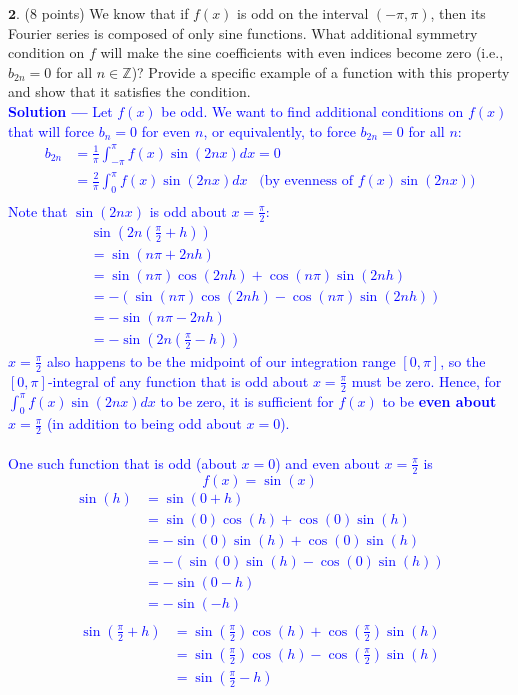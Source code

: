 \documentclass[12pt]{article}
\begin{document}
\vspace{0.3in}

\noindent $\textbf{2}$. (8 points) We know that if $f(x)$ is odd on the interval $(-\pi, \pi)$, then its Fourier series is composed of only sine functions. What additional symmetry condition on $f$ will make the sine coefficients with even indices become zero (i.e., $b_{2n} = 0 $ for all $n \in \mathbb{Z}$)? Provide a specific example of a function with this property and show that it satisfies the condition. \\

\textcolor{blue}{\textbf{Solution —} Let $f(x)$ be odd. We want to find additional conditions on $f(x)$ that will force $b_{n} = 0$ for even $n$, or equivalently, to force $b_{2n} = 0$ for all $n$:
\begin{align*}
b_{2n} &= \frac{1}{\pi} \int_{-\pi}^{\pi} f(x) \sin(2nx) dx = 0 \\
&= \frac{2}{\pi} \int_{0}^{\pi} f(x) \sin(2nx) dx \;\;\; \text{(by evenness of $f(x)\sin(2nx)$)} \\
\end{align*}
Note that $\sin(2nx)$ is odd about $x=\frac{\pi}{2}$: 
\begin{align*}
& \sin\left( 2n \left( \frac{\pi}{2} + h \right) \right) \\
&= \sin\left( n\pi + 2nh \right) \\
&= \sin(n\pi) \cos(2nh) + \cos(n\pi)\sin(2nh)\\
&= -(\sin(n\pi) \cos(2nh) - \cos(n\pi)\sin(2nh))\\
&= -\sin\left( n\pi - 2nh \right) \\
&= - \sin\left( 2n \left( \frac{\pi}{2} - h \right) \right)
\end{align*}
$x = \frac{\pi}{2}$ also happens to be the midpoint of our integration range $[0, \pi]$, so the $[0, \pi]$-integral of any function that is odd about $x=\frac{\pi}{2}$ must be zero. Hence, for $\int_{0}^{\pi} f(x)\sin(2nx)dx$ to be zero, it is sufficient for $f(x)$ to be \textbf{even about $x = \frac{\pi}{2}$} (in addition to being odd about $x=0$). \\ \\
One such function that is odd (about $x=0$) and even about $x=\frac{\pi}{2}$ is $$\boxed{f(x) = \sin(x)}$$ 
\begin{align*}
\sin(h) &= \sin(0 + h) \\
&= \sin(0)\cos(h) + \cos(0)\sin(h) \\
&= -\sin(0)\sin(h) + \cos(0)\sin(h) \\
&= -(\sin(0)\sin(h) - \cos(0)\sin(h)) \\
&= -\sin(0 - h) \\
&= -\sin(-h) \\
\end{align*}
\begin{align*}
\sin \left( \frac{\pi}{2} + h \right) &= \sin \left( \frac{\pi}{2} \right) \cos(h) + \cos \left( \frac{\pi}{2} \right) \sin(h) \\
&= \sin \left( \frac{\pi}{2} \right) \cos(h) - \cos \left( \frac{\pi}{2} \right) \sin(h) \\
&= \sin \left( \frac{\pi}{2} - h \right)
\end{align*}
}
\end{document}

